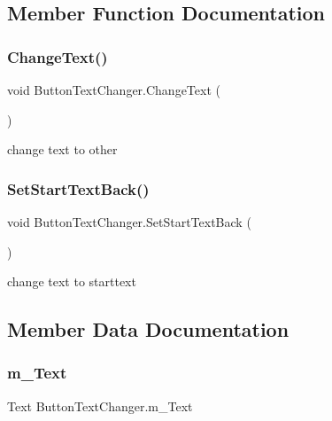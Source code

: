 \subsection{Member Function Documentation}
\mbox{\label{class_button_text_changer_a4142650e1f21cd495a27b0427d612149}} 
\subsubsection{\texorpdfstring{ChangeText()}{ChangeText()}}
{\footnotesize\ttfamily void Button\+Text\+Changer.\+Change\+Text (\begin{DoxyParamCaption}{ }\end{DoxyParamCaption})}



change text to other 

\mbox{\label{class_button_text_changer_abf152286d21937f8e274911123ce42e9}} 
\subsubsection{\texorpdfstring{SetStartTextBack()}{SetStartTextBack()}}
{\footnotesize\ttfamily void Button\+Text\+Changer.\+Set\+Start\+Text\+Back (\begin{DoxyParamCaption}{ }\end{DoxyParamCaption})}



change text to starttext 



\subsection{Member Data Documentation}
\mbox{\label{class_button_text_changer_ab23d962cea0c1eaf87b78f0728fff33c}} 
\subsubsection{\texorpdfstring{m\_Text}{m\_Text}}
{\footnotesize\ttfamily Text Button\+Text\+Changer.\+m\+\_\+\+Text}


